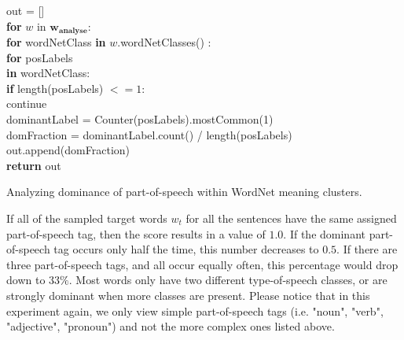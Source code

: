 \documentclass[a4paper,12pt,oneside,openright]{report}
\begin{document}
\hfill \break

\begin{algorithm}[H]
\SetAlgoLined
{}

out = [] \\

\textbf{for}  $w$ in $\mathbf{w_{\text{analyse}}}$:  \\
\quad \quad \textbf{for} wordNetClass \textbf{in} $w$.wordNetClasses() :  \\
\quad \quad \quad \textbf{for} posLabels \\
\quad \quad \quad \textbf{in} wordNetClass:  \\

\quad \quad \quad \quad \textbf{if} length(posLabels) $<= 1$: \\
\quad \quad \quad \quad \quad \quad  continue \\

\quad \quad \quad \quad dominantLabel = Counter(posLabels).mostCommon(1) \\

\quad \quad \quad \quad domFraction = dominantLabel.count() / length(posLabels) \\

\quad \quad \quad \quad out.append(domFraction) \\


\textbf{return} out
 
 \caption{Analyzing dominance of part-of-speech within WordNet meaning clusters.}
 \label{alg:dominancepos}
\end{algorithm}

\hfill \break

If all of the sampled target words $w_t$ for all the sentences have the same assigned part-of-speech tag, then the score results in a value of $1.0$.
If the dominant part-of-speech tag occurs only half the time, this number decreases to $0.5$.
If there are three part-of-speech tags, and all occur equally often, this percentage would drop down to $33\%$.
Most words only have two different type-of-speech classes, or are strongly dominant when more classes are present.
Please notice that in this experiment again, we only view simple part-of-speech tags (i.e. "noun", "verb", "adjective", "pronoun") and not the more complex ones listed above.
\end{document}
